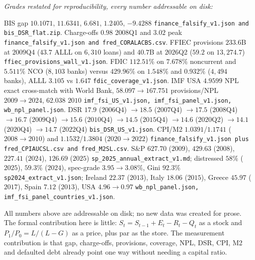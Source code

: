 \textit{Grades restated for reproducibility, every number addressable on disk:}

BIS gap $10.1071$, $11.6341$, $6.681$, $1.2405$, $-9.4288$ \texttt{finance\_falsify\_v1.json and bis\_DSR\_flat.zip}. Charge-offs $0.98$ $2008$Q1 and $3.02$ peak \texttt{finance\_falsify\_v1.json and fred\_CORALACBS.csv}. FFIEC provisions $233.6$B at $2009$Q4 ($43.7$ ALLL on $6{,}310$ loans) and $40.7$B at $2026$Q2 ($59.2$ on $13{,}274.7$) \texttt{ffiec\_provisions\_wall\_v1.json}. FDIC $112.51\%$ on $7.678\%$ noncurrent and $5.511\%$ NCO ($8{,}103$ banks) versus $429.96\%$ on $1.548\%$ and $0.932\%$ ($4{,}494$ banks), ALLL $3.105$ vs $1.647$ \texttt{fdic\_coverage\_v1.json}. IMF USA $4.9599$ NPL exact cross-match with World Bank, $58.097\to167.751$ provisions/NPL $2009\to2024$, $62.038$ $2010$ \texttt{imf\_fsi\_US\_v1.json, imf\_fsi\_panel\_v1.json, wb\_npl\_panel.json}. DSR $17.9$ ($2006$Q4) $\to18.5$ ($2007$Q4) $\to17.5$ ($2008$Q4) $\to16.7$ ($2009$Q4) $\to15.6$ ($2010$Q4) $\to14.5$ ($2015$Q4) $\to14.6$ ($2020$Q2) $\to14.1$ ($2020$Q4) $\to14.7$ ($2022$Q4) \texttt{bis\_DSR\_US\_v1.json}. CPI/M2 $1.0391$/$1.1741$ ($2008\to2010$) and $1.1532$/$1.3804$ ($2020\to2022$) \texttt{finance\_falsify\_v1.json plus fred\_CPIAUCSL.csv and fred\_M2SL.csv}. S\&P $627.70$ ($2009$), $429.63$ ($2008$), $227.41$ ($2024$), $126.69$ ($2025$) \texttt{sp\_2025\_annual\_extract\_v1.md}; distressed $58\%$ ($2025$), $59.3\%$ ($2024$), spec-grade $3.95\to3.08\%$, Gini $92.3\%$ \texttt{sp2024\_extract\_v1.json}; Ireland $22.37$ ($2013$), Italy $18.06$ ($2015$), Greece $45.97$ ($2017$), Spain $7.12$ ($2013$), USA $4.96\to0.97$ \texttt{wb\_npl\_panel.json, imf\_fsi\_panel\_countries\_v1.json}.

All numbers above are addressable on disk; no new data was created for prose. The formal contribution here is little: $S_t=S_{t-1}+E_t-R_t-Q_t$ as a stock and $P_1/P_0=L/(L-G)$ as a price, plus par as the store. The measurement contribution is that gap, charge-offs, provisions, coverage, NPL, DSR, CPI, M2 and defaulted debt already point one way without needing a capital ratio.

